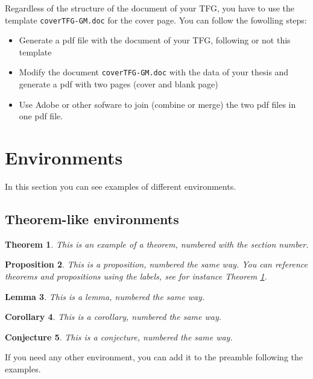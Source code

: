 \documentclass[12,twoside]{TFG-GM}
\newtheorem{theorem}{Theorem}[section]
\newtheorem{proposition}[theorem]{Proposition}
\newtheorem{lemma}[theorem]{Lemma}
\newtheorem{corollary}[theorem]{Corollary}
\newtheorem{conjecture}[theorem]{Conjecture}
\theoremstyle{definition}
\theoremstyle{remark}
\begin{document}
Regardless of the structure of the document of your TFG, you have to use the template \texttt{coverTFG-GM.doc} for the cover page. You can follow the fowolling steps:
\begin{itemize}
	\item Generate a pdf file with the document of your TFG, following or not this template
	\item Modify the document \texttt{coverTFG-GM.doc} with the data of your thesis and generate a pdf with two pages (cover and blank page)
	\item Use Adobe or other sofware to join (combine or merge) the two pdf files in one pdf file. 
\end{itemize}
 
\section{Environments}

In this section you can see examples of different environments.

\subsection{Theorem-like environments}

\begin{theorem} \label{th:example}
This is an example of a theorem, numbered with the section number.
\end{theorem}

\begin{proposition}
This is a proposition, numbered the same way. You can reference theorems and propositions using the labels, see for instance Theorem \ref{th:example}.
\end{proposition}

\begin{lemma}
This is a lemma, numbered the same way.
\end{lemma}

\begin{corollary}
This is a corollary, numbered the same way.
\end{corollary}

\begin{conjecture}
This is a conjecture, numbered the same way.
\end{conjecture}

If you need any other environment, you can add it to the preamble following the examples.

\end{document}
